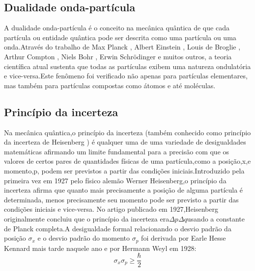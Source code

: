 \documentclass{report}
\begin{document}
\subsection{Dualidade onda-partícula}
A dualidade onda-partícula é o conceito na mecânica quântica de que cada partícula ou entidade quântica pode ser descrita como uma partícula ou uma onda.Através do trabalho de Max Planck , Albert Einstein , Louis de Broglie , Arthur Compton , Niels Bohr , Erwin Schrödinger e muitos outros, a teoria científica atual sustenta que todas as partículas exibem uma natureza ondulatória e vice-versa.Este fenômeno foi verificado não apenas para partículas elementares, mas também para partículas compostas como átomos e até moléculas. 
\subsection{Princípio da incerteza}
Na mecânica quântica,o princípio da incerteza (também conhecido como princípio da incerteza de Heisenberg ) é qualquer uma de uma variedade de desigualdades matemáticas afirmando um limite fundamental para a precisão com que os valores de certos pares de quantidades físicas de uma partícula,como a posição,x,e momento,p, podem ser previstos a partir das condições iniciais.Introduzido pela primeira vez em 1927 pelo físico alemão Werner Heisenberg,o princípio da incerteza afirma que quanto mais precisamente a posição de alguma partícula é determinada, menos precisamente seu momento pode ser previsto a partir das condições iniciais e vice-versa. No artigo publicado em 1927,Heisenberg originalmente concluiu que o princípio da incerteza era\(\Delta p \Delta q\)usando a constante de Planck completa.A desigualdade formal relacionando o desvio padrão da posição \(\sigma_x\) e o desvio padrão do momento \(\sigma_p\) foi derivada por Earle Hesse Kennard mais tarde naquele ano e por Hermann Weyl em 1928:
\begin{equation}
    \sigma_x \sigma_p \geq \frac{\hbar}{2}
\end{equation}
\end{document}
